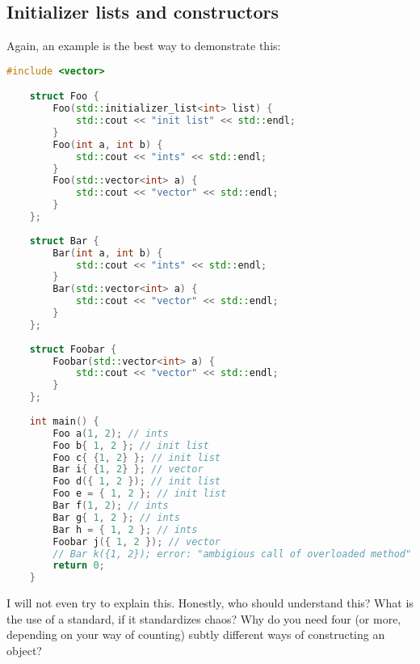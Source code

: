 \documentclass{scrartcl}
\begin{document}
\subsection{Initializer lists and constructors}
Again, an example is the best way to demonstrate this:
\begin{lstlisting}[language = c++]
    #include <vector>

    struct Foo {
        Foo(std::initializer_list<int> list) { 
            std::cout << "init list" << std::endl;
        }
        Foo(int a, int b) { 
            std::cout << "ints" << std::endl; 
        }
        Foo(std::vector<int> a) { 
            std::cout << "vector" << std::endl; 
        }
    };
    
    struct Bar {
        Bar(int a, int b) { 
            std::cout << "ints" << std::endl;
        }
        Bar(std::vector<int> a) {
            std::cout << "vector" << std::endl; 
        }
    };
    
    struct Foobar {
        Foobar(std::vector<int> a) { 
            std::cout << "vector" << std::endl; 
        }
    };
    
    int main() {
        Foo a(1, 2); // ints
        Foo b{ 1, 2 }; // init list
        Foo c{ {1, 2} }; // init list
        Bar i{ {1, 2} }; // vector
        Foo d({ 1, 2 }); // init list
        Foo e = { 1, 2 }; // init list
        Bar f(1, 2); // ints
        Bar g{ 1, 2 }; // ints
        Bar h = { 1, 2 }; // ints
        Foobar j({ 1, 2 }); // vector
        // Bar k({1, 2}); error: "ambigious call of overloaded method"
        return 0;
    }
\end{lstlisting}
I will not even try to explain this. Honestly, who should understand this?
What is the use of a standard, if it standardizes chaos?
Why do you need four (or more, depending on your way of counting) subtly different ways of constructing an object?
\end{document}
